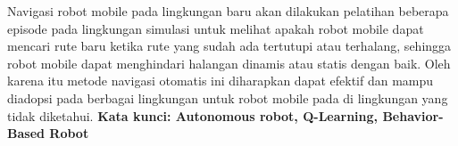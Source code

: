 Navigasi robot mobile pada lingkungan baru akan dilakukan pelatihan beberapa episode pada lingkungan simulasi untuk melihat apakah robot mobile dapat mencari rute baru ketika rute yang sudah ada tertutupi atau terhalang, sehingga robot mobile dapat menghindari halangan dinamis atau statis dengan baik. Oleh karena itu metode navigasi otomatis ini diharapkan dapat efektif dan mampu diadopsi pada berbagai lingkungan untuk robot mobile pada di lingkungan yang tidak diketahui.
\textbf{Kata kunci: Autonomous robot, Q-Learning, Behavior-Based Robot} 